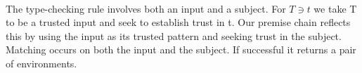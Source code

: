 {\begin{code}
\AgdaSymbol{(}\AgdaSpace{}%
\AgdaSymbol{)}\AgdaSpace{}%
\AgdaSymbol{(}\AgdaSpace{}%
\AgdaSymbol{)}\AgdaSpace{}%
\AgdaSymbol{=}\AgdaSpace{}%
\AgdaSpace{}%
\AgdaSpace{}%
\AgdaSymbol{(}\AgdaSpace{}%
\AgdaSpace{}%
\AgdaSpace{}%
\AgdaSymbol{(}\AgdaSpace{}%
\AgdaSymbol{))}\<%
\\
\>[0]\AgdaSpace{}%
\AgdaSymbol{(}\AgdaSpace{}%
\AgdaSymbol{)}\AgdaSpace{}%
\AgdaSymbol{(}\AgdaSpace{}%
\AgdaSymbol{)}\AgdaSpace{}%
\AgdaSymbol{(}\AgdaSpace{}%
\AgdaSymbol{(}\AgdaSpace{}%
\AgdaOperator{\AgdaInductiveConstructor{,}}\AgdaSpace{}%
\AgdaSymbol{))}\AgdaSpace{}%
\AgdaSymbol{=}\AgdaSpace{}%
\AgdaSpace{}%
\AgdaSpace{}%
\AgdaSymbol{(}\AgdaSpace{}%
\AgdaSpace{}%
\AgdaSpace{}%
\AgdaSymbol{(}\AgdaSpace{}%
\AgdaSymbol{(}\AgdaSpace{}%
\AgdaOperator{\AgdaInductiveConstructor{,}}\AgdaSpace{}%
\AgdaSpace{}%
\AgdaSpace{}%
\AgdaSpace{}%
\AgdaSpace{}%
\AgdaSymbol{(}\AgdaSpace{}%
\AgdaSpace{}%
\AgdaSymbol{)))))}\<%
\end{code}
}
The type-checking rule involves both an input and a subject. For
$T ∋ t$ we take T to be a trusted input and seek to establish trust
in t. Our premise chain reflects this by using the input as its
trusted pattern and seeking trust in the subject. Matching occurs on
both the input and the subject. If successful it returns a pair of
environments.
\begin{code}%
\>[0]\AgdaSpace{}%
\AgdaSpace{}%
\AgdaSymbol{:}\AgdaSpace{}%
\AgdaSpace{}%
\<%
\\
\>[0][@{}l@{\AgdaIndent{0}}]%
\>[2]\<%
\\
\>[2][@{}l@{\AgdaIndent{0}}]%
\>[4]%
\>[13]\AgdaSymbol{:}\AgdaSpace{}%
\AgdaSpace{}%
\<%
\\
%
\>[4]%
\>[13]\AgdaSymbol{:}\AgdaSpace{}%
\AgdaSpace{}%
\<%
\\
%
\>[4]\AgdaSpace{}%
\AgdaSymbol{:}\AgdaSpace{}%
\AgdaFunction{Σ[}\AgdaSpace{}%
\AgdaSpace{}%
\AgdaSpace{}%
\AgdaSpace{}%
\AgdaSpace{}%
\AgdaFunction{]}\AgdaSpace{}%
\AgdaSpace{}%
\AgdaSpace{}%
\AgdaSpace{}%
\<%
\end{code}
